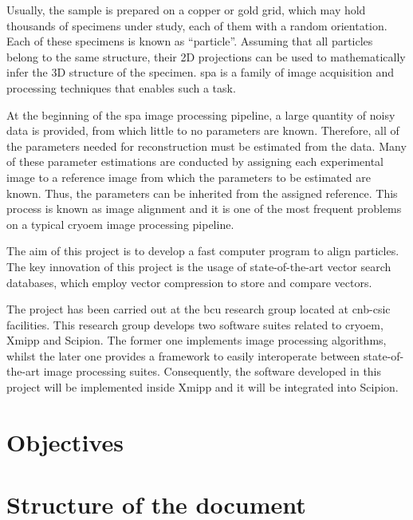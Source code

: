 \documentclass[../main.tex]{subfiles}
\begin{document}
Usually, the sample is prepared on a copper or gold grid, which may hold thousands of specimens under study, each of them with a random orientation. Each of these specimens is known as ``particle''. Assuming that all particles belong to the same structure, their 2D projections can be used to mathematically infer the 3D structure of the specimen\cite{cryoem101}. \Gls{spa} is a family of image acquisition and processing techniques that enables such a task.

At the beginning of the \gls{spa} image processing pipeline, a large quantity of noisy data is provided, from which little to no parameters are known. Therefore, all of the parameters needed for reconstruction must be estimated from the data. Many of these parameter estimations are conducted by assigning each experimental image to a reference image from which the parameters to be estimated are known. Thus, the parameters can be inherited from the assigned reference. This process is known as image alignment and it is one of the most frequent problems on a typical \gls{cryoem} image processing pipeline.

The aim of this project is to develop a fast computer program to align particles. The key innovation of this project is the usage of state-of-the-art vector search databases, which employ vector compression to store and compare vectors. 

The project has been carried out at the \gls{bcu} research group located at \gls{cnb}-\gls{csic} facilities. This research group develops two software suites related to \gls{cryoem}, Xmipp and Scipion. The former one implements image processing algorithms, whilst the later one provides a framework to easily interoperate between state-of-the-art image processing suites. Consequently, the software developed in this project will be implemented inside Xmipp and it will be integrated into Scipion.

\section{Objectives}


\section{Structure of the document}

\end{document}
